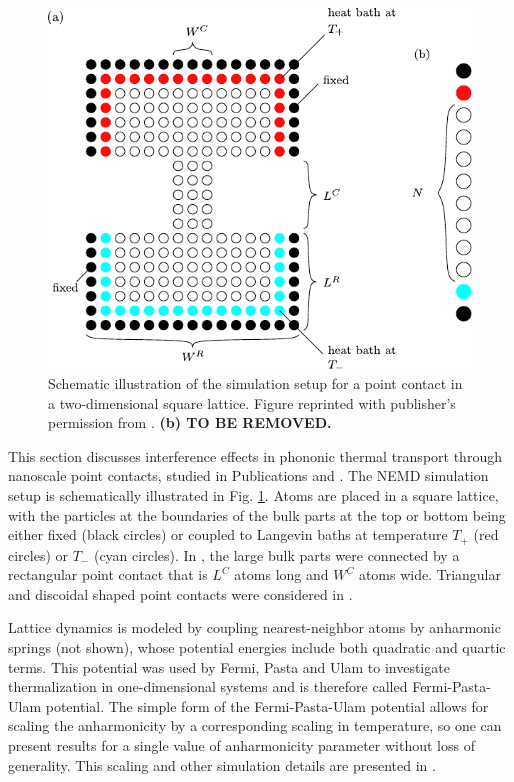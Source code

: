 \begin{figure}
\begin{center}
 \includegraphics[width=.85\columnwidth]{pics/fpu_fig1.pdf}
 \caption{Schematic illustration of the simulation setup for a point contact in a two-dimensional square lattice. Figure reprinted with publisher's permission from . \textbf{(b) TO BE REMOVED.}}
\label{fig:fpu_fig1}
\end{center}
\end{figure}

This section discusses interference effects in phononic thermal transport through nanoscale point contacts, studied in Publications  and . The NEMD simulation setup is schematically illustrated in Fig. \ref{fig:fpu_fig1}. Atoms are placed in a square lattice, with the particles at the boundaries of the bulk parts at the top or bottom being either fixed (black circles) or coupled to Langevin baths at temperature $T_+$ (red circles) or $T_-$ (cyan circles). In , the large bulk parts were connected by a rectangular point contact that is $L^C$ atoms long and $W^C$ atoms wide. Triangular and discoidal shaped point contacts were considered in . 

Lattice dynamics is modeled by coupling nearest-neighbor atoms by anharmonic springs (not shown), whose potential energies include both quadratic and quartic terms. This potential was used by Fermi, Pasta and Ulam to investigate thermalization in one-dimensional systems \cite{fermi55} and is therefore called Fermi-Pasta-Ulam potential. The simple form of the Fermi-Pasta-Ulam potential allows for scaling the anharmonicity by a corresponding scaling in temperature, so one can present results for a single value of anharmonicity parameter without loss of generality. This scaling and other simulation details are presented in . 


